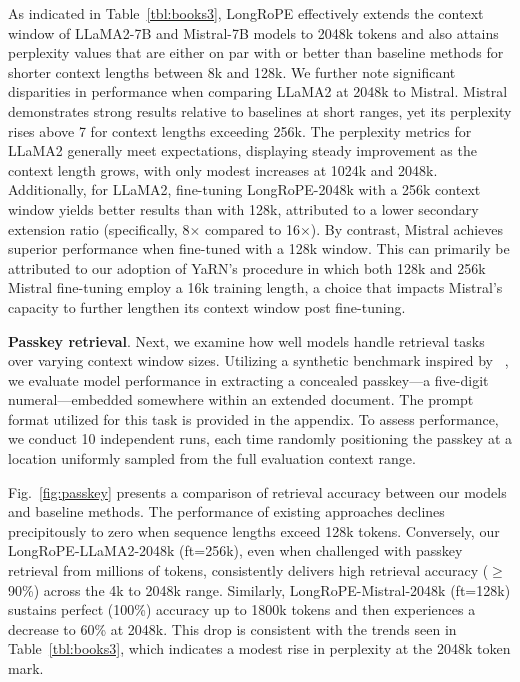 As indicated in Table~\ref{tbl:books3}, LongRoPE effectively extends the context window of LLaMA2-7B and Mistral-7B models to 2048k tokens and also attains perplexity values that are either on par with or better than baseline methods for shorter context lengths between 8k and 128k. We further note significant disparities in performance when comparing LLaMA2 at 2048k to Mistral. Mistral demonstrates strong results relative to baselines at short ranges, yet its perplexity rises above 7 for context lengths exceeding 256k. The perplexity metrics for LLaMA2 generally meet expectations, displaying steady improvement as the context length grows, with only modest increases at 1024k and 2048k. Additionally, for LLaMA2, fine-tuning LongRoPE-2048k with a 256k context window yields better results than with 128k, attributed to a lower secondary extension ratio (specifically, 8$\times$ compared to 16$\times$). By contrast, Mistral achieves superior performance when fine-tuned with a 128k window. This can primarily be attributed to our adoption of YaRN's procedure in which both 128k and 256k Mistral fine-tuning employ a 16k training length, a choice that impacts Mistral’s capacity to further lengthen its context window post fine-tuning.

\textbf{Passkey retrieval}. Next, we examine how well models handle retrieval tasks over varying context window sizes. Utilizing a synthetic benchmark inspired by ~\cite{passkey}, we evaluate model performance in extracting a concealed passkey—a five-digit numeral—embedded somewhere within an extended document. The prompt format utilized for this task is provided in the appendix. To assess performance, we conduct 10 independent runs, each time randomly positioning the passkey at a location uniformly sampled from the full evaluation context range.

Fig.~\ref{fig:passkey} presents a comparison of retrieval accuracy between our models and baseline methods. The performance of existing approaches declines precipitously to zero when sequence lengths exceed 128k tokens. Conversely, our LongRoPE-LLaMA2-2048k (ft=256k), even when challenged with passkey retrieval from millions of tokens, consistently delivers high retrieval accuracy ($\ge$90\%) across the 4k to 2048k range. Similarly, LongRoPE-Mistral-2048k (ft=128k) sustains perfect (100\%) accuracy up to 1800k tokens and then experiences a decrease to 60\% at 2048k. This drop is consistent with the trends seen in Table~\ref{tbl:books3}, which indicates a modest rise in perplexity at the 2048k token mark.

